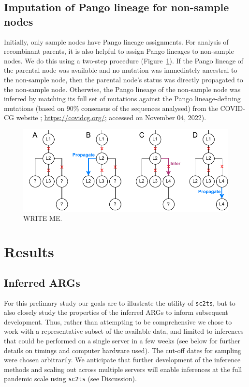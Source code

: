 \documentclass{article}
\begin{document}
\subsection{Imputation of Pango lineage for non-sample nodes}
Initially, only sample nodes have Pango lineage assignments.
For analysis of recombinant parents, it is also helpful to assign
Pango lineages to non-sample nodes. We do this
using a two-step procedure (Figure~\ref{fig:imputation}). If the Pango
lineage of the parental node was available and no mutation was immediately
ancestral to the non-sample node, then the parental node’s status was directly
propagated to the non-sample node. Otherwise, the Pango lineage of the
non-sample node was inferred by matching its full set of mutations against the
Pango lineage-defining mutations (based on 90\% consensus of the sequences
analysed) from the COVID-CG website \citep{Chen2021-zc};
\url{https://covidcg.org/}; accessed on November 04, 2022).

\begin{figure} \centering
\includegraphics[width=\textwidth]{figures/imputation.pdf}
\caption{\label{fig:imputation} WRITE ME. }
\end{figure}


\section{Results}
\subsection{Inferred ARGs}
For this prelimary study our goals are to illustrate the utility of
\texttt{sc2ts}, but to also closely study the properties of the
inferred ARGs to inform subsequent development. Thus, rather
than attempting to be comprehensive we chose to work with a
representative subset of the available data, and limited to
inferences that could be performed on a single server in
a few weeks (see below for further details on timings and
computer hardware used). The cut-off dates for sampling were chosen
arbitrarily. We anticipate that further development of the
inference methods and scaling out across multiple servers will
enable inferences at the full pandemic scale using \texttt{sc2ts}
(see Discussion).
\end{document}
